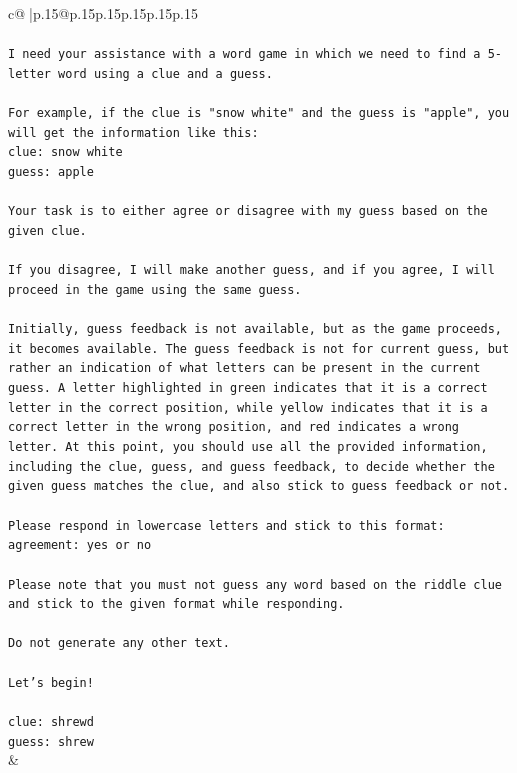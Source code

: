 \documentclass{article}
\begin{document}
{\begin{supertabular}{c@{$\;$}|p{.15\linewidth}@{}p{.15\linewidth}p{.15\linewidth}p{.15\linewidth}p{.15\linewidth}p{.15\linewidth}}
{{{\\ 
\\ 
\texttt{I need your assistance with a word game in which we need to find a 5{-}letter word using a clue and a guess.} \\
\\ 
\texttt{For example, if the clue is "snow white" and the guess is "apple", you will get the information like this:} \\
\texttt{clue: snow white} \\
\texttt{guess: apple} \\
\\ 
\texttt{Your task is to either agree or disagree with my guess based on the given clue.} \\
\\ 
\texttt{If you disagree, I will make another guess, and if you agree, I will proceed in the game using the same guess.} \\
\\ 
\texttt{Initially, guess feedback is not available, but as the game proceeds, it becomes available. The guess feedback is not for current guess, but rather an indication of what letters can be present in the current guess. A letter highlighted in green indicates that it is a correct letter in the correct position, while yellow indicates that it is a correct letter in the wrong position, and red indicates a wrong letter. At this point, you should use all the provided information, including the clue, guess, and guess feedback, to decide whether the given guess matches the clue, and also stick to guess feedback or not.} \\
\\ 
\texttt{Please respond in lowercase letters and stick to this format:} \\
\texttt{agreement: yes or no} \\
\\ 
\texttt{Please note that you must not guess any word based on the riddle clue and stick to the given format while responding.} \\
\\ 
\texttt{Do not generate any other text.} \\
\\ 
\texttt{Let's begin!} \\
\\ 
\texttt{clue: shrewd} \\
\texttt{guess: shrew} \\
            }
        }
    }
    & \\ \\


\end{supertabular}}
\end{document}
